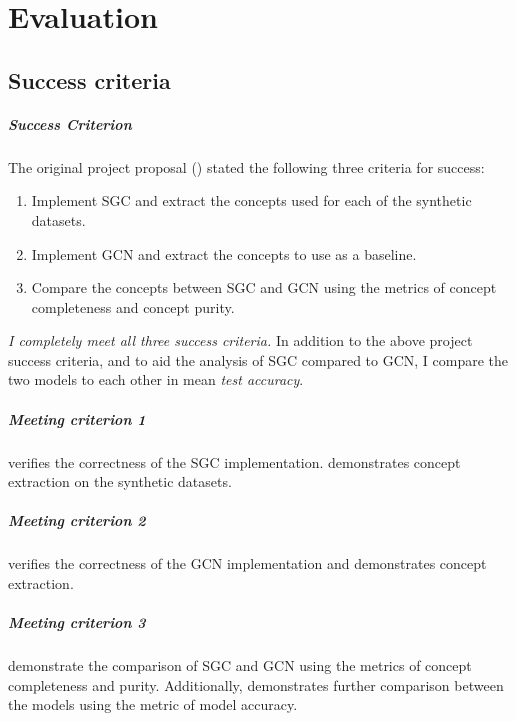 \chapter{Evaluation}

\section{Success criteria}

\paragraph{Success Criterion}
The original project proposal () stated the following three criteria for success:
\begin{enumerate}
    \item 
        Implement SGC and extract the concepts used for each of the synthetic datasets.
        \label{crit1}
    \item 
        Implement GCN and extract the concepts to use as a baseline.
        \label{crit2}
    \item 
        Compare the concepts between SGC and GCN using the metrics of concept completeness and concept purity.
        \label{crit3}
\end{enumerate}

\emph{I completely meet all three success criteria.}
In addition to the above project success criteria, and to aid the analysis of SGC compared to GCN, 
I compare the two models to each other in mean \emph{test accuracy}.

\paragraph{Meeting criterion 1}
 verifies the correctness of the SGC implementation.
 demonstrates concept extraction on the synthetic datasets.

\paragraph{Meeting criterion 2}
 verifies the correctness of the GCN implementation and demonstrates concept extraction.

\paragraph{Meeting criterion 3}
 demonstrate the comparison of SGC and GCN using the metrics of concept completeness and purity.
Additionally,  demonstrates further comparison between the models using the metric of model accuracy.

